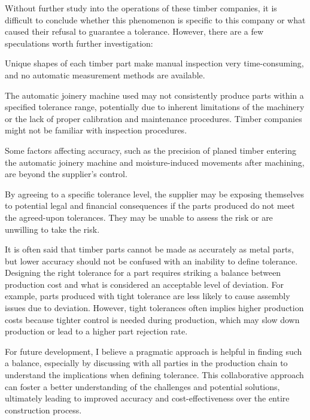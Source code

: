 Without further study into the operations of these timber companies, it is difficult to conclude whether this phenomenon is specific to this company or what caused their refusal to guarantee a tolerance. However, there are a few speculations worth further investigation:

\begin{description}[] %

	\item [Economic Considerations --] Unique shapes of each timber part make manual inspection very time-consuming, and no automatic measurement methods are available.

	\item [Limited Capabilities --] The automatic joinery machine used may not consistently produce parts within a specified tolerance range, potentially due to inherent limitations of the machinery or the lack of proper calibration and maintenance procedures. Timber companies might not be familiar with inspection procedures.

	\item [Industry Norms --] Some factors affecting accuracy, such as the precision of planed timber entering the automatic joinery machine and moisture-induced movements after machining, are beyond the supplier's control.

	\item [Liability Concerns --] By agreeing to a specific tolerance level, the supplier may be exposing themselves to potential legal and financial consequences if the parts produced do not meet the agreed-upon tolerances. They may be unable to assess the risk or are unwilling to take the risk.

\end{description}
It is often said that timber parts cannot be made as accurately as metal parts, but lower accuracy should not be confused with an inability to define tolerance.
Designing the right tolerance for a part requires striking a balance between production cost and what is considered an acceptable level of deviation. For example, parts produced with tight tolerance are less likely to cause assembly issues due to deviation. However, tight tolerances often implies higher production costs because tighter control is needed during production, which may slow down production or lead to a higher part rejection rate.

For future development, I believe a pragmatic approach is helpful in finding such a balance, especially by discussing with all parties in the production chain to understand the implications when defining tolerance. This collaborative approach can foster a better understanding of the challenges and potential solutions, ultimately leading to improved accuracy and cost-effectiveness over the entire construction process.

